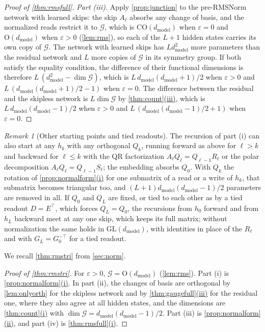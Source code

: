 \documentclass[10pt]{article}
\theoremstyle{definition}
\theoremstyle{remark}
\newtheorem{remark}[theorem]{Remark}
\newcommand{\dm}{d_{\mathrm{model}}}
\newcommand{\GL}{\mathrm{GL}}
\newcommand{\Ort}{\mathrm{O}}
\newcommand{\CO}{\mathrm{CO}}
\newcommand{\G}{\mathcal{G}}
\DeclareRobustCommand{\cpref}[2]{\hyperref[#1:#2]{\cref*{#1}(#2)}}
\begin{document}
\begin{proof}[Proof of \cref{thm:rmsfull}]
\emph{Part (iii).} Apply \cref{prop:junction} to the pre-RMSNorm network with learned skips: the skip $A_\ell$ absorbs any change of basis, and the normalized reads restrict it to $\G$, which is $\CO(\dm)$ when $\varepsilon = 0$ and $\Ort(\dm)$ when $\varepsilon > 0$ (\cref{lem:rms}), so each of the $L+1$ hidden states carries its own copy of $\G$. The network with learned skips has $L\dm^2$ more parameters than the residual network and $L$ more copies of $\G$ in its symmetry group. If both satisfy the equality condition, the difference of their functional dimensions is therefore $L\,(\dm^2 - \dim\G)$, which is $L\,\dm(\dm+1)/2$ when $\varepsilon > 0$ and $L\,(\dm(\dm+1)/2 - 1)$ when $\varepsilon = 0$. The difference between the residual and the skipless network is $L\dim\G$ by \cpref{thm:count}{iii}, which is $L\,\dm(\dm-1)/2$ when $\varepsilon > 0$ and $L\,(\dm(\dm-1)/2 + 1)$ when $\varepsilon = 0$.
\end{proof}

\begin{remark}[Other starting points and tied readouts]\label{rem:rmsstart}
The recursion of part (i) can also start at any $h_k$ with any orthogonal $Q_k$, running forward as above for $\ell > k$ and backward for $\ell \le k$ with the QR factorization $A_\ell Q_\ell = Q_{\ell-1}R_\ell$ or the polar decomposition $A_\ell Q_\ell = Q_{\ell-1}S_\ell$; the embedding absorbs $Q_0$. With $Q_k$ the rotation of \cpref{prop:normalform}{i} for one submatrix of a read or a write of $h_k$, that submatrix becomes triangular too, and $(L+1)\dm(\dm-1)/2$ parameters are removed in all. If $Q_0$ and $Q_L$ are fixed, or tied to each other as by a tied readout $D = E^\top$, which forces $Q_L = Q_0$, the recursions from $h_0$ forward and from $h_L$ backward meet at any one skip, which keeps its full matrix; without normalization the same holds in $\GL(\dm)$, with identities in place of the $R_\ell$ and with $G_L = G_0^{-\top}$ for a tied readout.
\end{remark}

We recall \cref{thm:rmstri} from \cref{sec:norm}.
\thmRMSTri*

\begin{proof}[Proof of \cref{thm:rmstri}]
For $\varepsilon > 0$, $\G = \Ort(\dm)$ (\cref{lem:rms}). Part (i) is \cpref{prop:normalform}{i}. In part (ii), the changes of basis are orthogonal by \cref{lem:onlyorth} for the skipless network and by \cpref{thm:gaugefull}{iii} for the residual one, where they also agree at all hidden states, and the dimensions are \cpref{thm:count}{i} with $\dim\G = \dm(\dm-1)/2$. Part (iii) is \cpref{prop:normalform}{ii}, and part (iv) is \cpref{thm:rmsfull}{i}.
\end{proof}
\end{document}
